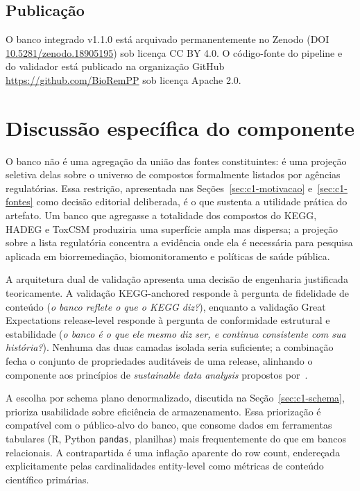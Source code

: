 \subsection{Publicação}

O banco integrado v1.1.0 está arquivado permanentemente no Zenodo (DOI \href{https://doi.org/10.5281/zenodo.18905195}{10.5281/zenodo.18905195}) sob licença CC BY 4.0. O código-fonte do pipeline e do validador está publicado na organização GitHub \url{https://github.com/BioRemPP} sob licença Apache 2.0.

\section{Discussão específica do componente}
\label{sec:c1-discussao}

O banco \biorempp{} não é uma agregação da união das fontes constituintes: é uma projeção seletiva delas sobre o universo de compostos formalmente listados por agências regulatórias. Essa restrição, apresentada nas Seções~\ref{sec:c1-motivacao} e~\ref{sec:c1-fontes} como decisão editorial deliberada, é o que sustenta a utilidade prática do artefato. Um banco que agregasse a totalidade dos compostos do KEGG, HADEG e ToxCSM produziria uma superfície ampla mas dispersa; a projeção sobre a lista regulatória concentra a evidência onde ela é necessária para pesquisa aplicada em biorremediação, biomonitoramento e políticas de saúde pública.

A arquitetura dual de validação apresenta uma decisão de engenharia justificada teoricamente. A validação KEGG-anchored responde à pergunta de fidelidade de conteúdo (\textit{o banco reflete o que o KEGG diz?}), enquanto a validação Great Expectations release-level responde à pergunta de conformidade estrutural e estabilidade (\textit{o banco é o que ele mesmo diz ser, e continua consistente com sua história?}). Nenhuma das duas camadas isolada seria suficiente; a combinação fecha o conjunto de propriedades auditáveis de uma release, alinhando o componente aos princípios de \textit{sustainable data analysis} propostos por~\citet{molder2025snakemake}.

A escolha por schema plano denormalizado, discutida na Seção~\ref{sec:c1-schema}, prioriza usabilidade sobre eficiência de armazenamento. Essa priorização é compatível com o público-alvo do banco, que consome dados em ferramentas tabulares (R, Python \texttt{pandas}, planilhas) mais frequentemente do que em bancos relacionais. A contrapartida é uma inflação aparente do row count, endereçada explicitamente pelas cardinalidades entity-level como métricas de conteúdo científico primárias.


